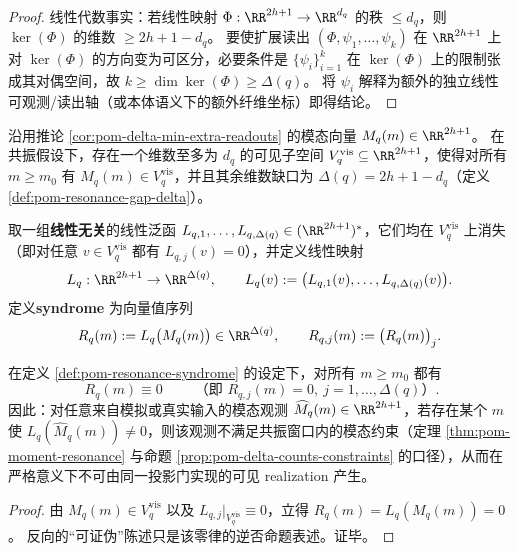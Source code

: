 \begin{proof}
线性代数事实：若线性映射 \(\Phi:\RR^{2h+1}\to\RR^{d_q}\) 的秩 \(\le d_q\)，则 \(\ker(\Phi)\) 的维数 \(\ge 2h+1-d_q\)。
要使扩展读出 \((\Phi,\psi_1,\ldots,\psi_k)\) 在 \(\RR^{2h+1}\) 上对 \(\ker(\Phi)\) 的方向变为可区分，必要条件是
\(\{\psi_i\}_{i=1}^k\) 在 \(\ker(\Phi)\) 上的限制张成其对偶空间，故 \(k\ge \dim\ker(\Phi)\ge \Delta(q)\)。
将 \(\psi_i\) 解释为额外的独立线性可观测/读出轴（或本体语义下的额外纤维坐标）即得结论。
\end{proof}

\begin{definition}\label{def:pom-resonance-syndrome}
沿用推论 \ref{cor:pom-delta-min-extra-readouts} 的模态向量
\(
M_q(m)\in\RR^{2h+1}
\)。
在共振假设下，存在一个维数至多为 \(d_q\) 的可见子空间 \(V_q^{\mathrm{vis}}\subseteq\RR^{2h+1}\)，使得对所有 \(m\ge m_0\) 有 \(M_q(m)\in V_q^{\mathrm{vis}}\)，并且其余维数缺口为 \(\Delta(q)=2h+1-d_q\)（定义 \ref{def:pom-resonance-gap-delta}）。
\par
取一组\textbf{线性无关}的线性泛函 \(L_{q,1},\dots,L_{q,\Delta(q)}\in(\RR^{2h+1})^\ast\)，它们均在 \(V_q^{\mathrm{vis}}\) 上消失（即对任意 \(v\in V_q^{\mathrm{vis}}\) 都有 \(L_{q,j}(v)=0\)），并定义线性映射
\[
L_q:\RR^{2h+1}\to\RR^{\Delta(q)},\qquad
L_q(v):=\bigl(L_{q,1}(v),\dots,L_{q,\Delta(q)}(v)\bigr).
\]
定义\textbf{syndrome} 为向量值序列
\[
R_q(m):=L_q\bigl(M_q(m)\bigr)\in\RR^{\Delta(q)},
\qquad
R_{q,j}(m):=\bigl(R_q(m)\bigr)_j.
\]
\end{definition}

\begin{corollary}\label{cor:pom-resonance-syndrome-audit}
在定义 \ref{def:pom-resonance-syndrome} 的设定下，对所有 \(m\ge m_0\) 都有
\[
\boxed{\;R_q(m)\equiv 0\;}
\qquad\text{（即 }R_{q,j}(m)=0,\ j=1,\dots,\Delta(q)\text{）}.
\]
因此：对任意来自模拟或真实输入的模态观测 \(\widehat M_q(m)\in\RR^{2h+1}\)，若存在某个 \(m\) 使 \(L_q(\widehat M_q(m))\neq 0\)，则该观测不满足共振窗口内的模态约束（定理 \ref{thm:pom-moment-resonance} 与命题 \ref{prop:pom-delta-counts-constraints} 的口径），从而在严格意义下不可由同一投影门实现的可见 realization 产生。
\end{corollary}
\begin{proof}
由 \(M_q(m)\in V_q^{\mathrm{vis}}\) 以及 \(L_{q,j}|_{V_q^{\mathrm{vis}}}\equiv 0\)，立得 \(R_q(m)=L_q(M_q(m))=0\)。
反向的“可证伪”陈述只是该零律的逆否命题表述。证毕。
\end{proof}

